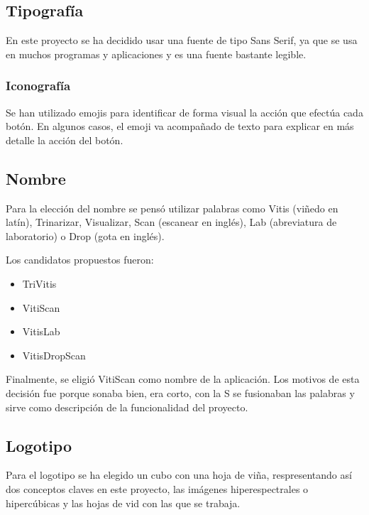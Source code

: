 
\subsection{Tipografía}
En este proyecto se ha decidido usar una fuente de tipo Sans Serif, ya que se usa en muchos programas y aplicaciones y es una fuente bastante legible.


\subsubsection{Iconografía}
Se han utilizado emojis para identificar de forma visual la acción que efectúa cada botón. En algunos casos, el emoji va acompañado de texto para explicar en más detalle la acción del botón.


\subsection{Nombre}
Para la elección del nombre se pensó utilizar palabras como Vitis (viñedo en latín), Trinarizar, Visualizar, Scan (escanear en inglés), Lab (abreviatura de laboratorio) o Drop (gota en inglés).

Los candidatos propuestos fueron:
\begin{itemize}
    \item {TriVitis}
    \item {VitiScan}
    \item {VitisLab}
    \item {VitisDropScan}
\end{itemize}

Finalmente, se eligió VitiScan como nombre de la aplicación. Los motivos de esta decisión fue porque sonaba bien, era corto, con la S se fusionaban las palabras y sirve como descripción de la funcionalidad del proyecto.

\subsection{Logotipo}
Para el logotipo se ha elegido un cubo con una hoja de viña, respresentando así dos conceptos claves en este proyecto, las imágenes hiperespectrales o hipercúbicas y las hojas de vid con las que se trabaja.
